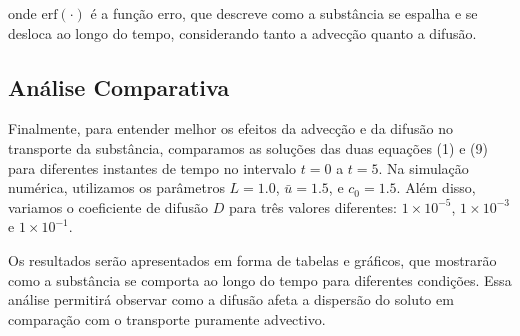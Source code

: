 onde \( \text{erf}(\cdot) \) é a função erro, que descreve como a substância se espalha e se desloca ao longo do tempo, considerando tanto a advecção quanto a difusão.

\subsection{Análise Comparativa}

Finalmente, para entender melhor os efeitos da advecção e da difusão no transporte da substância, comparamos as soluções das duas equações (1) e (9) para diferentes instantes de tempo no intervalo \( t = 0 \) a \( t = 5 \). Na simulação numérica, utilizamos os parâmetros \( L = 1.0 \), \( \bar{u} = 1.5 \), e \( c_0 = 1.5 \). Além disso, variamos o coeficiente de difusão \( D \) para três valores diferentes: \( 1 \times 10^{-5} \), \( 1 \times 10^{-3} \) e \( 1 \times 10^{-1} \).

Os resultados serão apresentados em forma de tabelas e gráficos, que mostrarão como a substância se comporta ao longo do tempo para diferentes condições. Essa análise permitirá observar como a difusão afeta a dispersão do soluto em comparação com o transporte puramente advectivo.
